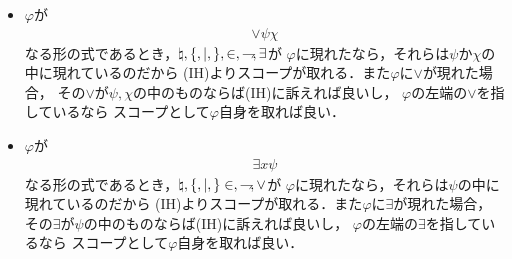 \begin{metaprf}
\begin{description}
\begin{itemize}
					\item $\varphi$が
						\begin{align}
							\vee \psi \chi
						\end{align}
						なる形の式であるとき，$\natural,\{,|,\},\in,\rightharpoondown\hspace{-0.25em},\exists$が
						$\varphi$に現れたなら，それらは$\psi$か$\chi$の中に現れているのだから
						(IH)よりスコープが取れる．また$\varphi$に$\vee$が現れた場合，
						その$\vee$が$\psi,\chi$の中のものならば(IH)に訴えれば良いし，
						$\varphi$の左端の$\vee$を指しているなら
						スコープとして$\varphi$自身を取れば良い．
						
					\item $\varphi$が
						\begin{align}
							\exists x \psi
						\end{align}
						なる形の式であるとき，$\natural,\{,|,\}\in,\rightharpoondown\hspace{-0.25em},\vee$が
						$\varphi$に現れたなら，それらは$\psi$の中に現れているのだから
						(IH)よりスコープが取れる．また$\varphi$に$\exists$が現れた場合，
						その$\exists$が$\psi$の中のものならば(IH)に訴えれば良いし，
						$\varphi$の左端の$\exists$を指しているなら
						スコープとして$\varphi$自身を取れば良い．
						\QED
				\end{itemize}
		\end{description}
	\end{metaprf}
	
